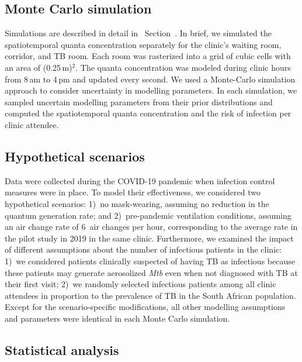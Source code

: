 \documentclass[fleqn,11pt]{wlscirep}
\begin{document}
\subsection*{Monte Carlo simulation}

Simulations are described in detail in \supp~Section~. In brief, we simulated the spatiotemporal quanta concentration separately for the clinic's waiting room, corridor, and TB room. Each room was rasterized into a grid of cubic cells with an area of (0.25\,m)$^2$. The quanta concentration was modeled during clinic hours from 8\,am to 4\,pm and updated every second. We used a Monte-Carlo simulation approach to consider uncertainty in modelling parameters. In each simulation, we sampled uncertain modelling parameters from their prior distributions and computed the spatiotemporal quanta concentration and the risk of infection per clinic attendee. 

\subsection*{Hypothetical scenarios}

Data were collected during the COVID-19 pandemic when infection control measures were in place. To model their effectiveness, we considered two hypothetical scenarios: 1)~no mask-wearing, \ie assuming no reduction in the quantum generation rate; and 2)~pre-pandemic ventilation conditions, \ie assuming an air change rate of 6~air changes per hour, corresponding to the average rate in the pilot study in 2019 in the same clinic\cite{Zurcher2022JID}. Furthermore, we examined the impact of different assumptions about the number of infectious patients in the clinic: 1)~we considered patients clinically suspected of having TB as infectious because these patients may generate aerosolized \emph{Mtb} even when not diagnosed with TB at their first visit\cite{Patterson2024PNAS}; 2)~we randomly selected infectious patients among all clinic attendees in proportion to the prevalence of TB in the South African population\cite{Moyo2022LancetID}. Except for the scenario-specific modifications, all other modelling assumptions and parameters were identical in each Monte Carlo simulation. 

\subsection*{Statistical analysis}
\end{document}
